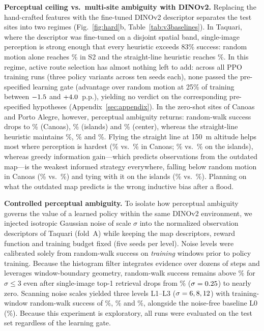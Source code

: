 \textbf{Perceptual ceiling vs.\ multi-site ambiguity with DINOv2.}
Replacing the hand-crafted features with the fine-tuned DINOv2 descriptor separates the test sites into two regimes (Fig.~\ref{fig:hard}b, Table~\ref{tab:v3baselines}). In Taquari, where the descriptor was fine-tuned on a disjoint spatial band, single-image perception is strong enough that every heuristic exceeds 83\% success: random motion alone reaches \vThreeTaqSTwoRandom\% in S2 and the straight-line heuristic reaches \vThreeTaqSTwoStraight\%. In this regime, active route selection has almost nothing left to add: across all \vThreeMatrixRuns{} PPO training runs (three policy variants across ten seeds each), none passed the pre-specified learning gate (advantage over random motion at 25\% of training between $-1.5$ and $+4.0$~p.p.), yielding no verdict on the corresponding pre-specified hypotheses (Appendix~\ref{sec:appendix}). In the zero-shot sites of Canoas and Porto Alegre, however, perceptual ambiguity returns: random-walk success drops to \vThreeCanoasRandom\% (Canoas), \vThreeIslandsRandom\% (islands) and \vThreeCenterRandom\% (center), whereas the straight-line heuristic maintains \vThreeCanoasStraight\%, \vThreeIslandsStraight\% and \vThreeCenterStraight\%. Flying the straight line at 150~m altitude helps most where perception is hardest (\vThreeCanoasStraightHigh\% vs.\ \vThreeCanoasStraight\% in Canoas; \vThreeIslandsStraightHigh\% vs.\ \vThreeIslandsStraight\% on the islands), whereas greedy information gain—which predicts observations from the outdated map—is the weakest informed strategy everywhere, falling below random motion in Canoas (\vThreeCanoasGreedy\% vs.\ \vThreeCanoasRandom\%) and tying with it on the islands (\vThreeIslandsGreedy\% vs.\ \vThreeIslandsRandom\%). Planning on what the outdated map predicts is the wrong inductive bias after a flood.

\textbf{Controlled perceptual ambiguity.}
To isolate how perceptual ambiguity governs the value of a learned policy within the same DINOv2 environment, we injected isotropic Gaussian noise of scale $\sigma$ into the normalized observation descriptors of Taquari (fold~A) while keeping the map descriptors, reward function and training budget fixed (five seeds per level). Noise levels were calibrated solely from random-walk success on \emph{training} windows prior to policy training. Because the histogram filter integrates evidence over dozens of steps and leverages window-boundary geometry, random-walk success remains above \eMaxSigmaScanThree\% for $\sigma\le 3$ even after single-image top-1 retrieval drops from \eTopOneLowSigma\% ($\sigma=0.25$) to nearly zero. Scanning \eNSigmas{} noise scales yielded three levels L1--L3 ($\sigma=6,8,12$) with training-window random-walk success of \eRandTrainLOne\%, \eRandTrainLTwo\% and \eRandTrainLThree\%, alongside the noise-free baseline L0 (\eRandTrainLZero\%). Because this experiment is exploratory, all runs were evaluated on the test set regardless of the learning gate.

